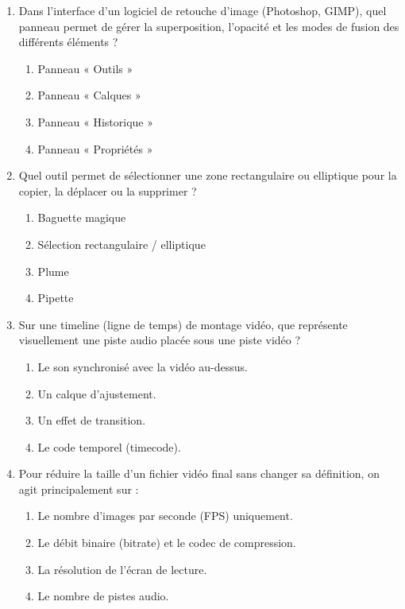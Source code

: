\documentclass[11pt]{article}
\begin{document}
\begin{exercice}
\begin{enumerate}
    \item Dans l'interface d'un logiciel de retouche d'image (Photoshop, GIMP), quel panneau permet de gérer la superposition, l'opacité et les modes de fusion des différents éléments ?
    \begin{enumerate}
        \item Panneau « Outils »
        \item Panneau « Calques »
        \item Panneau « Historique »
        \item Panneau « Propriétés »
    \end{enumerate}
    \item Quel outil permet de sélectionner une zone rectangulaire ou elliptique pour la copier, la déplacer ou la supprimer ?
    \begin{enumerate}
        \item Baguette magique
        \item Sélection rectangulaire / elliptique
        \item Plume
        \item Pipette
    \end{enumerate}
    \item Sur une timeline (ligne de temps) de montage vidéo, que représente visuellement une piste audio placée sous une piste vidéo ?
    \begin{enumerate}
        \item Le son synchronisé avec la vidéo au-dessus.
        \item Un calque d'ajustement.
        \item Un effet de transition.
        \item Le code temporel (timecode).
    \end{enumerate}
    \item Pour réduire la taille d'un fichier vidéo final sans changer sa définition, on agit principalement sur :
    \begin{enumerate}
        \item Le nombre d'images par seconde (FPS) uniquement.
        \item Le débit binaire (bitrate) et le codec de compression.
        \item La résolution de l'écran de lecture.
        \item Le nombre de pistes audio.
    \end{enumerate}
\end{enumerate}
\end{exercice}
\end{document}

